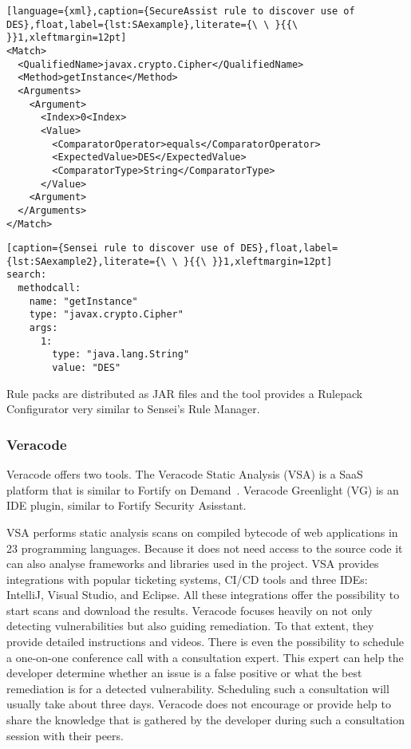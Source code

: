 \begin{lstlisting}[language={xml},caption={SecureAssist rule to discover use of DES},float,label={lst:SAexample},literate={\ \ }{{\ }}1,xleftmargin=12pt] 
<Match>
  <QualifiedName>javax.crypto.Cipher</QualifiedName>
  <Method>getInstance</Method>
  <Arguments>
    <Argument>
      <Index>0<Index>
      <Value>
        <ComparatorOperator>equals</ComparatorOperator>
        <ExpectedValue>DES</ExpectedValue>
        <ComparatorType>String</ComparatorType>
      </Value>
    <Argument>
  </Arguments>
</Match>
\end{lstlisting}

\begin{lstlisting}[caption={Sensei rule to discover use of DES},float,label={lst:SAexample2},literate={\ \ }{{\ }}1,xleftmargin=12pt]
search:
  methodcall:
    name: "getInstance"
    type: "javax.crypto.Cipher"
    args:
      1:
        type: "java.lang.String"
        value: "DES"
\end{lstlisting}

Rule packs are distributed as JAR files and the tool provides a Rulepack Configurator very similar to Sensei's Rule Manager.

\subsubsection{Veracode}
Veracode offers two tools. The Veracode Static Analysis (VSA) is a SaaS platform that is similar to Fortify on Demand~\cite{veracode}. Veracode Greenlight (VG) is an IDE plugin, similar to Fortify Security Asisstant.

VSA performs static analysis scans on compiled bytecode of web applications in 23 programming languages. Because it does not need access to the source code it can also analyse frameworks and libraries used in the project. VSA provides integrations with popular ticketing systems, CI/CD tools and three IDEs: IntelliJ, Visual Studio, and Eclipse. All these integrations offer the possibility to start scans and download the results. Veracode focuses heavily on not only detecting vulnerabilities but also guiding remediation. To that extent, they provide detailed instructions and videos. There is even the possibility to schedule a one-on-one conference call with a consultation expert. This expert can help the developer determine whether an issue is a false positive or what the best remediation is for a detected vulnerability. Scheduling such a consultation will usually take about three days. Veracode does not encourage or provide help to share the knowledge that is gathered by the developer during such a consultation session with their peers. 

